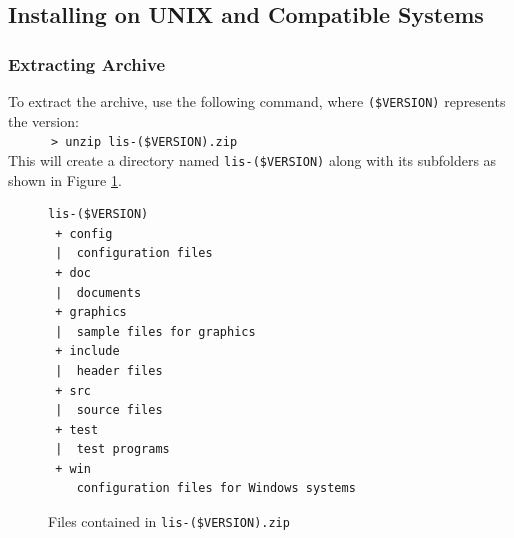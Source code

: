 \documentclass[a4paper]{article}
\begin{document}
\subsection{Installing on UNIX and Compatible Systems}
\subsubsection{Extracting Archive}
To extract the archive, use the following command,  
where \verb|($VERSION)| represents the version:\\
 \verb&      > unzip lis-($VERSION).zip &\\
This will create a directory named {\tt lis-(\$VERSION)} along 
with its subfolders as shown in Figure \ref{listargz}.

\begin{figure}[htbp]
\begin{center}
\begin{verbatim}
lis-($VERSION)
 + config
 |  configuration files
 + doc
 |  documents
 + graphics
 |  sample files for graphics
 + include
 |  header files
 + src
 |  source files
 + test
 |  test programs
 + win
    configuration files for Windows systems
\end{verbatim}
\end{center}
\caption{Files contained in {\tt lis-(\$VERSION).zip}}
\label{listargz}
\end{figure}
\end{document}
